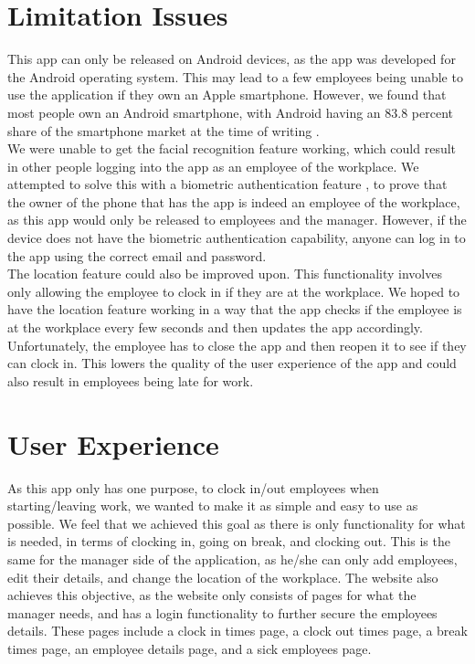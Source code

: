 \section{Limitation Issues}
This app can only be released on Android devices, as the app was developed for the Android operating system. This may lead to a few employees being unable to use the application if they own an Apple smartphone. However, we found that most people own an Android smartphone, with Android having an 83.8 percent share of the smartphone market at the time of writing \cite{idc}. 
\\

We were unable to get the facial recognition feature working, which could result in other people logging into the app as an employee of the workplace. We attempted to solve this with a biometric authentication feature \cite{bioauth}, to prove that the owner of the phone that has the app is indeed an employee of the workplace, as this app would only be released to employees and the manager. However, if the device does not have the biometric authentication capability, anyone can log in to the app using the correct email and password. 
\\ 

The location feature \cite{location} could also be improved upon. This functionality involves only allowing the employee to clock in if they are at the workplace. We hoped to have the location feature working in a way that the app checks if the employee is at the workplace every few seconds and then updates the app accordingly. Unfortunately, the employee has to close the app and then reopen it to see if they can clock in. This lowers the quality of the user experience of the app and could also result in employees being late for work. 

\section{User Experience}
As this app only has one purpose, to clock in/out employees when starting/leaving work, we wanted to make it as simple and easy to use as possible. We feel that we achieved this goal as there is only functionality for what is needed, in terms of clocking in, going on break, and clocking out. This is the same for the manager side of the application, as he/she can only add employees, edit their details, and change the location of the workplace. The website also achieves this objective, as the website only consists of pages for what the manager needs, and has a login functionality to further secure the employees details. These pages include a clock in times page, a clock out times page, a break times page, an employee details page, and a sick employees page.

